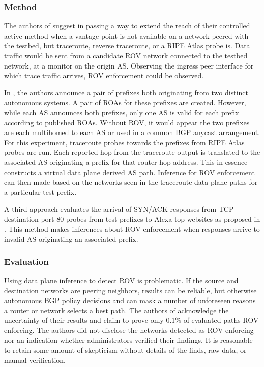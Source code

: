 \documentclass[sigconf]{acmart}
\begin{document}
\subsubsection{Method}

The authors of \cite{reuter_towards_2018} suggest in passing a way to
extend the reach of their controlled active method when a vantage point
is not available on a network peered with the testbed, but traceroute,
reverse traceroute, or a RIPE Atlas probe
is.\cite{katz-bassett_reverse_2010}\cite{ripe_ncc_staff_ripe_2015} Data
traffic would be sent from a candidate ROV network connected to the
testbed network, at a monitor on the origin AS.  Observing the ingress
peer interface for which trace traffic arrives, ROV enforcement could be
observed.

In \cite{hlavacek_practical_2018}, the authors announce a pair of
prefixes both originating from two distinct autonomous systems.  A pair
of ROAs for these prefixes are created.  However, while each AS
announces both prefixes, only one AS is valid for each prefix according
to published ROAs.  Without ROV, it would appear the two prefixes are
each multihomed to each AS or used in a common BGP anycast arrangement.
For this experiment, traceroute probes towards the prefixes from RIPE
Atlas probes are run.  Each reported hop from the traceroute output is
translated to the associated AS originating a prefix for that router hop
address.  This in essence constructs a virtual data plane derived AS
path.  Inference for ROV enforcement can then made based on the networks
seen in the traceroute data plane paths for a particular test prefix.

A third approach evaluates the arrival of SYN/ACK responses from TCP
destination port 80 probes from test prefixes to Alexa top websites as
proposed in \cite{hlavacek_practical_2018}.\cite{noauthor_alexa_2018}
This method makes inferences about ROV enforcement when responses arrive
to invalid AS originating an associated prefix.

\subsubsection{Evaluation}

Using data plane inference to detect ROV is problematic.  If the source
and destination networks are peering neighbors, results can be reliable,
but otherwise autonomous BGP policy decisions and can mask a number of
unforeseen reasons a router or network selects a best path.  The authors
of \cite{hlavacek_practical_2018} acknowledge the uncertainty of their
results and claim to prove only 0.1\% of evaluated paths ROV enforcing.
The authors did not disclose the networks detected as ROV enforcing nor
an indication whether administrators verified their findings.  It is
reasonable to retain some amount of skepticism without details of the
finds, raw data, or manual verification.
\end{document}
